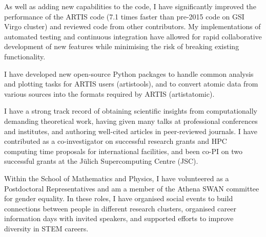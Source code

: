 \documentclass[11pt]{article} %
\begin{document}
As well as adding new capabilities to the code, I have significantly improved the performance of the ARTIS code (7.1 times faster than pre-2015 code on GSI Virgo cluster) and reviewed code from other contributors. My implementations of automated testing and continuous integration have allowed for rapid collaborative development of new features while minimising the risk of breaking existing functionality.

I have developed new open-source Python packages to handle common analysis and plotting tasks for ARTIS users (artistools), and to convert atomic data from various sources into the formats required by ARTIS (artistatomic).

I have a strong track record of obtaining scientific insights from computationally demanding theoretical work, having given many talks at professional conferences and institutes, and authoring well-cited articles in peer-reviewed journals. I have contributed as a co-investigator on successful research grants and HPC computing time proposals for international facilities, and been co-PI on two successful grants at the Jülich Supercomputing Centre (JSC).

Within the School of Mathematics and Physics, I have volunteered as a Postdoctoral Representatives and am a member of the Athena SWAN committee for gender equality. In these roles, I have organised social events to build connections between people in different research clusters, organised career information days with invited speakers, and supported efforts to improve diversity in STEM careers.


%
\end{document}
